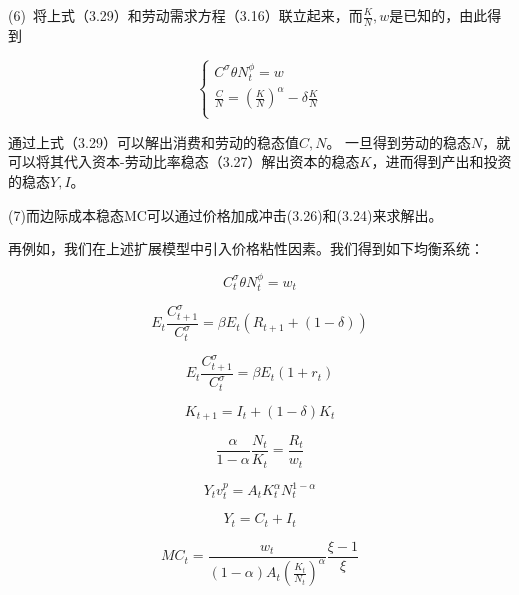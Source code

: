 \documentclass[cn,10pt,math=newtx,citestyle=gb7714-2015,bibstyle=gb7714-2015]{elegantbook}
\begin{document}
	(6)~将上式（3.29）和劳动需求方程（3.16）联立起来，而$\frac{K}{N},w$是已知的，由此得到
	
	\begin{equation}\label{label}
		\left\{
		\begin{aligned}
			C^{\sigma}\theta N_t^{\phi}=w\\
			\frac{C}{N}=(\frac{K}{N})^{\alpha}-\delta \frac{K}{N}\\
		\end{aligned}
		\right.
	\end{equation}
	
	通过上式（3.29）可以解出消费和劳动的稳态值$C,N$。 一旦得到劳动的稳态$N$，就可以将其代入资本-劳动比率稳态（3.27）解出资本的稳态$K$，进而得到产出和投资的稳态$Y,I$。
	
	(7)而边际成本稳态MC可以通过价格加成冲击(3.26)和(3.24)来求解出。
	
	再例如，我们在上述扩展模型中引入价格粘性因素。我们得到如下均衡系统：
	
	\begin{equation}\label{label}
		C_t^{\sigma}\theta N_t^{\phi}=w_t
	\end{equation}
	
	\begin{equation}\label{label}
		E_t\frac{C_{t+1}^{\sigma}}{C_t^{\sigma}}=\beta E_t(R_{t+1}+(1-\delta))
	\end{equation}
	
	\begin{equation}\label{label}
		E_t\frac{C_{t+1}^{\sigma}}{C_t^{\sigma}}=\beta E_t(1+r_t)
	\end{equation}
	
	\begin{equation}\label{label}
		K_{t+1}=I_t+(1-\delta)K_t
	\end{equation}
	
	\begin{equation}\label{label}
		\frac{\alpha}{1-\alpha} \frac{N_t}{K_t}=\frac{R_t}{w_t}
	\end{equation}
	
	\begin{equation}\label{label}
		Y_tv_t^p=A_tK_t^{\alpha}N_t^{1-\alpha}
	\end{equation}
	
	\begin{equation}\label{label}
		Y_t=C_t+I_t
	\end{equation}
	
	\begin{equation}\label{label}
		MC_t=\frac{w_t}{(1-\alpha)A_t(\frac{K_t}{N_t})^{\alpha}}\frac{\xi-1}{\xi}
	\end{equation}
	
\end{document}
